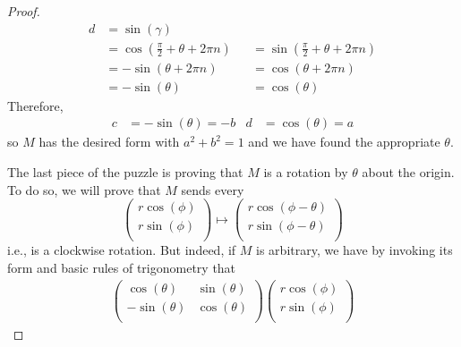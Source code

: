 \documentclass[../psets.tex]{subfiles}
\begin{document}
\begin{enumerate}
\begin{enumerate}
\begin{proof}
\begin{align*}
                    d &= \sin(\gamma)\\
                &= \cos(\frac{\pi}{2}+\theta+2\pi n)&
                    &= \sin(\frac{\pi}{2}+\theta+2\pi n)\\
                &= -\sin(\theta+2\pi n)&
                    &= \cos(\theta+2\pi n)\\
                &= -\sin(\theta)&
                    &= \cos(\theta)
            \end{align*}
            Therefore,
            \begin{align*}
                c &= -\sin(\theta) = -b&
                d &= \cos(\theta) = a
            \end{align*}
            so $M$ has the desired form with $a^2+b^2=1$ and we have found the appropriate $\theta$.\par\smallskip
            The last piece of the puzzle is proving that $M$ is a rotation by $\theta$ about the origin. To do so, we will prove that $M$ sends every
            \begin{equation*}
                \begin{pmatrix}
                    r\cos(\phi)\\
                    r\sin(\phi)\\
                \end{pmatrix}
                \mapsto
                \begin{pmatrix}
                    r\cos(\phi-\theta)\\
                    r\sin(\phi-\theta)\\
                \end{pmatrix}
            \end{equation*}
            i.e., is a clockwise rotation.
            But indeed, if $M$ is arbitrary, we have by invoking its form and basic rules of trigonometry that
            \begin{align*}
                \begin{pmatrix}
                    \cos(\theta) & \sin(\theta)\\
                    -\sin(\theta) & \cos(\theta)\\
                \end{pmatrix}
                \begin{pmatrix}
                    r\cos(\phi)\\
                    r\sin(\phi)\\
                \end{pmatrix}

\end{align*}
\end{proof}
\end{enumerate}
\end{enumerate}
\end{document}
